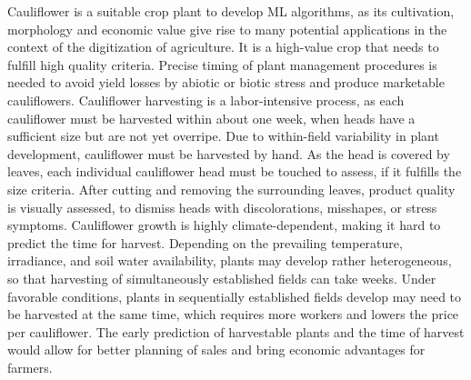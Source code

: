 \documentclass{article}
\begin{document}
Cauliflower is a suitable crop plant to develop ML algorithms, as its cultivation, morphology and economic value give rise to many potential applications in the context of the digitization of agriculture.
It is a high-value crop that needs to fulfill high quality criteria. Precise timing of plant management procedures is needed to avoid yield losses by abiotic or biotic stress and produce marketable cauliflowers. Cauliflower harvesting is a labor-intensive process, as each cauliflower must be harvested within about one week, when heads have a sufficient size but are not yet overripe. Due to within-field variability in plant development, cauliflower must be harvested by hand. As the head is covered by leaves, each individual cauliflower head must be touched to assess, if it fulfills the size criteria. After cutting and removing the surrounding leaves, product quality is visually assessed, to dismiss heads with discolorations, misshapes, or stress symptoms. Cauliflower growth is highly climate-dependent, making it hard to predict the time for harvest. Depending on the prevailing temperature, irradiance, and soil water availability, plants may develop rather heterogeneous, so that harvesting of simultaneously established fields can take weeks. Under favorable conditions, plants in sequentially established fields develop may need to be harvested at the same time, which requires more workers and lowers the price per cauliflower. The early prediction of harvestable plants and the time of harvest would allow for better planning of sales and bring economic advantages for farmers.
\end{document}
